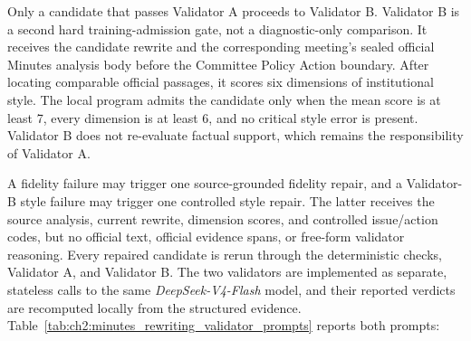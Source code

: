Only a candidate that passes Validator A proceeds to Validator B. Validator B
is a second hard training-admission gate, not a diagnostic-only comparison. It
receives the candidate rewrite and the corresponding meeting's sealed official
Minutes analysis body before the Committee Policy Action boundary. After
locating comparable official passages, it scores six dimensions of
institutional style. The local program admits the candidate only when the mean
score is at least 7, every dimension is at least 6, and no critical style error
is present. Validator B does not re-evaluate factual support, which remains the
responsibility of Validator A.

A fidelity failure may trigger one source-grounded fidelity repair, and a
Validator-B style failure may trigger one controlled style repair. The latter
receives the source analysis, current rewrite, dimension scores, and controlled
issue/action codes, but no official text, official evidence spans, or free-form
validator reasoning. Every repaired candidate is rerun through the deterministic
checks, Validator A, and Validator B. The two validators are implemented as
separate, stateless calls to the same \textit{DeepSeek-V4-Flash} model, and
their reported verdicts are recomputed locally from the structured evidence.
Table~\ref{tab:ch2:minutes_rewriting_validator_prompts} reports both prompts:



\begingroup
\footnotesize
\setlength{\tabcolsep}{6pt}
\renewcommand{\arraystretch}{1.10}

